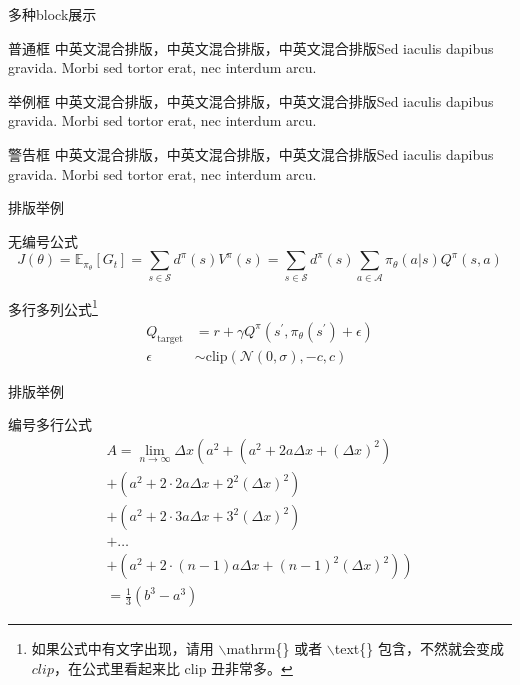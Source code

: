 \documentclass{beamer}
\begin{document}
\begin{frame}{多种block展示}
	\begin{block}{普通框}
		中英文混合排版，中英文混合排版，中英文混合排版Sed iaculis
		dapibus gravida. Morbi sed tortor erat, nec interdum arcu. 
	\end{block}
	\begin{exampleblock}{举例框}
		中英文混合排版，中英文混合排版，中英文混合排版Sed iaculis
		dapibus gravida. Morbi sed tortor erat, nec interdum arcu.
	\end{exampleblock}
	\begin{alertblock}{警告框}
		中英文混合排版，中英文混合排版，中英文混合排版Sed iaculis
		dapibus gravida. Morbi sed tortor erat, nec interdum arcu.
	\end{alertblock}
\end{frame}

\begin{frame}{排版举例}
    \begin{exampleblock}{无编号公式} %
        \begin{equation*}
            J(\theta) = \mathbb{E}_{\pi_\theta}[G_t] = \sum_{s\in\mathcal{S}} d^\pi (s)V^\pi(s)=\sum_{s\in\mathcal{S}} d^\pi(s)\sum_{a\in\mathcal{A}}\pi_\theta(a|s)Q^\pi(s,a)
        \end{equation*}
    \end{exampleblock}
    \begin{exampleblock}{多行多列公式\footnote{如果公式中有文字出现，请用 $\backslash$mathrm\{\} 或者 $\backslash$text\{\} 包含，不然就会变成 $clip$，在公式里看起来比 $\mathrm{clip}$ 丑非常多。}}
        \begin{align}
            Q_\mathrm{target}&=r+\gamma Q^\pi(s^\prime, \pi_\theta(s^\prime)+\epsilon)\\
            \epsilon&\sim\mathrm{clip}(\mathcal{N}(0, \sigma), -c, c)\nonumber
        \end{align}
    \end{exampleblock}
\end{frame}

\begin{frame}{排版举例}
    \begin{exampleblock}{编号多行公式}
        \begin{multline}
            A=\lim_{n\rightarrow\infty}\Delta x\left(a^{2}+\left(a^{2}+2a\Delta x+\left(\Delta x\right)^{2}\right)\right.\label{eq:reset}\\
            +\left(a^{2}+2\cdot2a\Delta x+2^{2}\left(\Delta x\right)^{2}\right)\\
            +\left(a^{2}+2\cdot3a\Delta x+3^{2}\left(\Delta x\right)^{2}\right)\\
            +\ldots\\
            \left.+\left(a^{2}+2\cdot(n-1)a\Delta x+(n-1)^{2}\left(\Delta x\right)^{2}\right)\right)\\
            =\frac{1}{3}\left(b^{3}-a^{3}\right)
        \end{multline}
    \end{exampleblock}
\end{frame}
\end{document}

